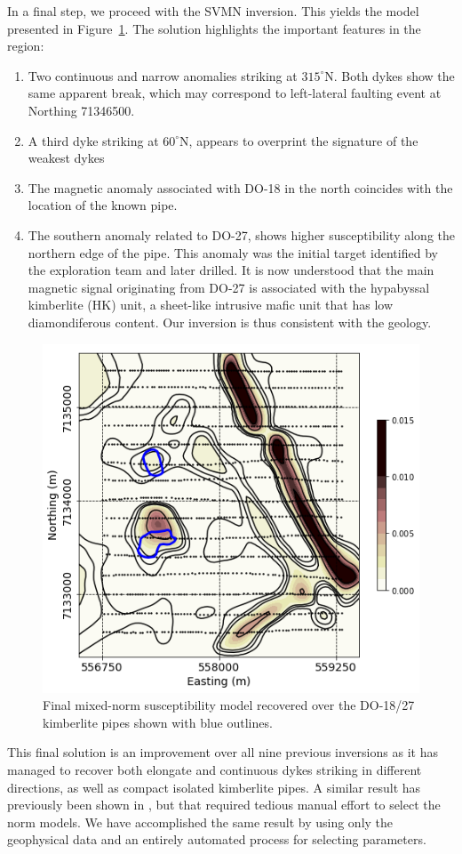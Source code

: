 \documentclass[extra,referee]{gji}
\begin{document}
In a final step, we proceed with the SVMN inversion. This yields the model presented in Figure~\ref{TKC_Final}. The solution highlights the important features in the region:
\begin{enumerate}
\item Two continuous and narrow anomalies striking at $315^\circ$N. Both dykes show the same apparent break, which may correspond to left-lateral faulting event at Northing 71346500.
\item A third dyke striking at $60^\circ$N, appears to overprint the signature of the weakest dykes
\item The magnetic anomaly associated with DO-18 in the north coincides with the location of the known pipe.
\item The southern anomaly related to DO-27, shows higher susceptibility along the northern edge of the pipe. This anomaly was the initial target identified by the exploration team and later drilled. It is now understood that the main magnetic signal originating from DO-27 is associated with the hypabyssal kimberlite (HK) unit, a sheet-like intrusive mafic unit that has low diamondiferous content. Our inversion is thus consistent with the geology.
\end{enumerate}
\begin{figure}
\includegraphics[width=\columnwidth]{Figures/MAG_TKC_FinalModel.png}
\caption{Final mixed-norm susceptibility model recovered over the DO-18/27 kimberlite pipes shown with blue outlines.}
\label{TKC_Final}
\end{figure}
This final solution is an improvement over all nine previous inversions as it has managed to recover both elongate and continuous dykes striking in different directions, as well as compact isolated kimberlite pipes. A similar result has previously been shown in \citet{Fournier2015}, but that required tedious manual effort to select the norm models. We have accomplished the same result by using only the geophysical data and an entirely automated process for selecting parameters.
\end{document}
